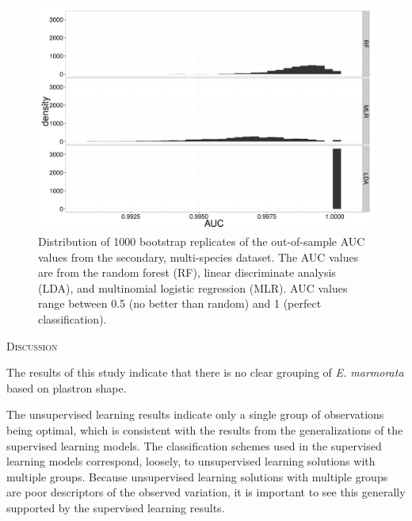 \documentclass[12pt,letterpaper]{article}
\renewcommand{\section}[1]{%
\bigskip
\begin{center}
\begin{Large}
\normalfont\scshape #1
\medskip
\end{Large}
\end{center}}
\begin{document}
\begin{figure}[ht]
  \centering
  \includegraphics[height = 0.5\textheight, width = \textwidth, keepaspectratio = true]{figure/seven_boot}
  \caption{Distribution of 1000 bootstrap replicates of the out-of-sample AUC values from the secondary, multi-species dataset. The AUC values are from the random forest (RF), linear discriminate analysis (LDA), and multinomial logistic regression (MLR). AUC values range between 0.5 (no better than random) and 1 (perfect classification).}
  \label{fig:seven_boot}
\end{figure}


\section{Discussion}

The results of this study indicate that there is no clear grouping of \textit{E. marmorata} based on plastron shape.

The unsupervised learning results indicate only a single group of observations being optimal, which is consistent with the results from the generalizations of the supervised learning models. The classification schemes used in the supervised learning models correspond, loosely, to unsupervised learning solutions with multiple groups. Because unsupervised learning solutions with multiple groups are poor descriptors of the observed variation, it is important to see this generally supported by the supervised learning results.
\end{document}
